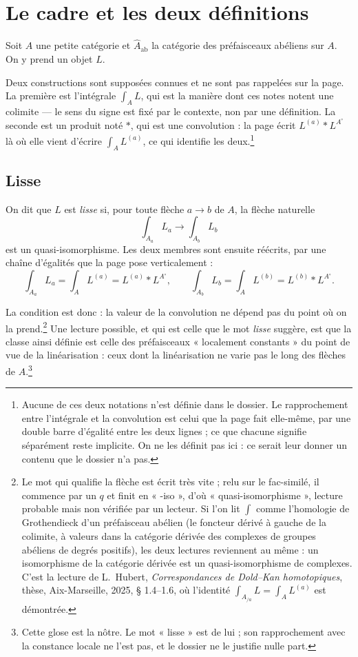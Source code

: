 \documentclass[11pt,a4paper]{article}
\begin{document}
\section*{Le cadre et les deux définitions}

Soit $A$ une petite catégorie et $\hat{A}_{\mathrm{ab}}$ la catégorie des
préfaisceaux abéliens sur $A$. On y prend un objet $L$.

Deux constructions sont supposées connues et ne sont pas rappelées sur la page.
La première est l'intégrale $\int_{A} L$, qui est la manière dont ces notes
notent une colimite --- le sens du signe est fixé par le contexte, non par une
définition. La seconde est un produit noté $*$, qui est une convolution : la
page écrit $L^{(a)} * L^{A^{\circ}}$ là où elle vient d'écrire
$\int_{A} L^{(a)}$, ce qui identifie les deux.\footnote{Aucune de ces deux
notations n'est définie dans le dossier. Le rapprochement entre l'intégrale et
la convolution est celui que la page fait elle-même, par une double barre
d'égalité entre les deux lignes ; ce que chacune signifie séparément reste
implicite. On ne les définit pas ici : ce serait leur donner un contenu que le
dossier n'a pas.}

\subsection*{Lisse}

On dit que $L$ est \emph{lisse} si, pour toute flèche $a \to b$ de $A$, la
flèche naturelle
\[
\int_{A_{a}} L_{a} \longrightarrow \int_{A_{b}} L_{b}
\]
est un quasi-isomorphisme. Les deux membres sont ensuite réécrits, par une chaîne
d'égalités que la page pose verticalement :
\[
\int_{A_{a}} L_{a} = \int_{A} L^{(a)} = L^{(a)} * L^{A^{\circ}},
\qquad
\int_{A_{b}} L_{b} = \int_{A} L^{(b)} = L^{(b)} * L^{A^{\circ}}.
\]

La condition est donc : la valeur de la convolution ne dépend pas du point où
on la prend.\footnote{Le mot qui qualifie la flèche est écrit très vite ; relu
sur le fac-similé, il commence par un $q$ et finit en « -iso », d'où
« quasi-isomorphisme », lecture probable mais non vérifiée par un lecteur. Si
l'on lit $\int$ comme l'homologie de Grothendieck d'un préfaisceau abélien (le
foncteur dérivé à gauche de la colimite, à valeurs dans la catégorie dérivée
des complexes de groupes abéliens de degrés positifs), les deux lectures
reviennent au même : un isomorphisme de la catégorie dérivée est un
quasi-isomorphisme de complexes. C'est la lecture de L.~Hubert, \emph{Correspondances
de Dold--Kan homotopiques}, thèse, Aix-Marseille, 2025, § 1.4--1.6, où
l'identité $\int_{A_{/a}} L = \int_{A} L^{(a)}$ est démontrée.} Une lecture
possible, et qui est celle que le mot \emph{lisse} suggère, est que la classe
ainsi définie est celle des préfaisceaux « localement constants » du point de
vue de la linéarisation : ceux dont la linéarisation ne varie pas le long des
flèches de $A$.\footnote{Cette glose est la nôtre. Le mot « lisse » est de lui ;
son rapprochement avec la constance locale ne l'est pas, et le dossier ne le
justifie nulle part.}
\end{document}
